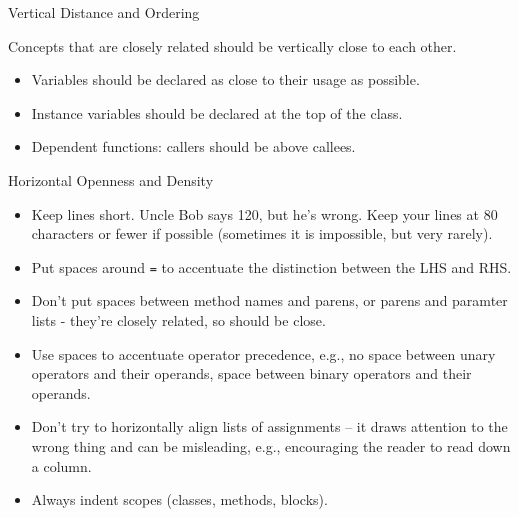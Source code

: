 \documentclass{beamer}
\begin{document}
\begin{frame}[fragile]{Vertical Distance and Ordering}


Concepts that are closely related should be vertically close to each other.
\begin{itemize}
\item Variables should be declared as close to their usage as possible.
\item Instance variables should be declared at the top of the class.
\item Dependent functions: callers should be above callees.
\end{itemize}


\end{frame}

\begin{frame}[fragile]{Horizontal Openness and Density}

\begin{itemize}
\item Keep lines short.  Uncle Bob says 120, but he's wrong.  Keep your lines at 80 characters or fewer if possible (sometimes it is impossible, but very rarely).
\item Put spaces around {\tt =} to accentuate the distinction between the LHS and RHS.
\item Don't put spaces between method names and parens, or parens and paramter lists - they're closely related, so should be close.
\item Use spaces to accentuate operator precedence, e.g., no space between unary operators and their operands, space between binary operators and their operands.
\item Don't try to horizontally align lists of assignments -- it draws attention to the wrong thing and can be misleading, e.g., encouraging the reader to read down a column.
\item Always indent scopes (classes, methods, blocks).
\end{itemize}


\end{frame}
\end{document}
